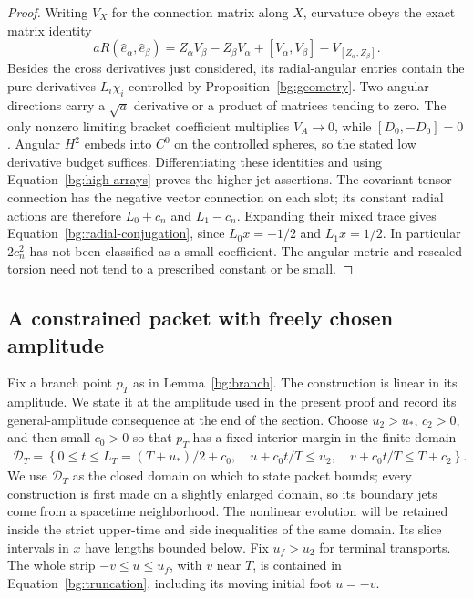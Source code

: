 \begin{proof}
Writing $V_X$ for the connection matrix along $X$, curvature obeys
the exact matrix identity
\begin{equation}\label{bg:curvature-matrix}
 aR(\hat e_\alpha,\hat e_\beta)
 =Z_\alpha V_\beta-Z_\beta V_\alpha
       +[V_\alpha,V_\beta]-V_{[Z_\alpha,Z_\beta]}.
\end{equation}
Besides the cross derivatives just considered, its radial-angular
entries contain the pure derivatives $L_i\chi_i$ controlled by
Proposition~\ref{bg:geometry}.  Two angular directions carry a
$\sqrt a$ derivative or a product of matrices tending to zero.
The only nonzero limiting bracket coefficient multiplies
$V_A\to0$, while $[D_0,-D_0]=0$.  Angular $H^2$ embeds into
$C^0$ on the controlled spheres, so the stated low derivative
budget suffices.  Differentiating these identities and using
Equation~\eqref{bg:high-arrays} proves the higher-jet assertions.
The covariant tensor connection has the negative vector connection
on each slot; its constant radial actions are therefore
$L_0+c_n$ and $L_1-c_n$.  Expanding their mixed trace gives
Equation~\eqref{bg:radial-conjugation}, since
$L_0x=-1/2$ and $L_1x=1/2$.  In particular $2c_n^2$ has not
been classified as a small coefficient.  The angular metric and
rescaled torsion need not tend to a prescribed constant or be small.
\end{proof}

\subsection{A constrained packet with freely chosen amplitude}\label{bg:linear-packet-section}

Fix a branch point $p_T$ as in Lemma~\ref{bg:branch}. The construction
is linear in its amplitude. We state it at the amplitude used in the
present proof and record its general-amplitude consequence at the end
of the section. Choose
$u_2>u_*$, $c_2>0$, and then small $c_0>0$ so that $p_T$ has
a fixed interior margin in the finite domain
\begin{equation}\label{bg:packet-domain}
\begin{gathered}
 \mathcal D_T=\left\{0\le t\le L_T=(T+u_*)/2+c_0,\quad
 u+c_0t/T\le u_2,\quad v+c_0t/T\le T+c_2\right\}.
\end{gathered}
\end{equation}
We use $\mathcal D_T$ as the closed domain on which to state packet
bounds; every construction is first made on a slightly enlarged domain,
so its boundary jets come from a spacetime neighborhood. The nonlinear
evolution will be retained inside the strict upper-time and side
inequalities of the same domain. Its slice intervals in $x$ have
lengths bounded below. Fix $u_f>u_2$
for terminal transports.  The whole strip $-v\le u\le u_f$,
with $v$ near $T$, is contained in Equation~\eqref{bg:truncation},
including its moving initial foot $u=-v$.

